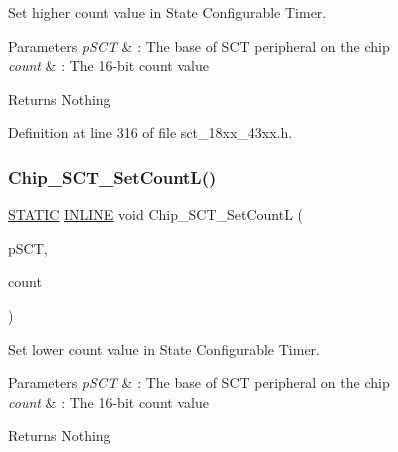 Set higher count value in State Configurable Timer. 


\begin{DoxyParams}{Parameters}
{\em p\+S\+CT} & \+: The base of S\+CT peripheral on the chip \\
\hline
{\em count} & \+: The 16-\/bit count value \\
\hline
\end{DoxyParams}
\begin{DoxyReturn}{Returns}
Nothing 
\end{DoxyReturn}


Definition at line 316 of file sct\+\_\+18xx\+\_\+43xx.\+h.

\mbox{\label{group___s_c_t__18_x_x__43_x_x_gac9d69eb39a8131925508015bf36c22f7}} 
\subsubsection{\texorpdfstring{Chip\+\_\+\+S\+C\+T\+\_\+\+Set\+Count\+L()}{Chip\_SCT\_SetCountL()}}
{\footnotesize\ttfamily \hyperlink{group___l_p_c___types___public___macros_ga10b2d890d871e1489bb02b7e70d9bdfb}{S\+T\+A\+T\+IC} \hyperlink{spifi__18xx__43xx_8h_a2eb6f9e0395b47b8d5e3eeae4fe0c116}{I\+N\+L\+I\+NE} void Chip\+\_\+\+S\+C\+T\+\_\+\+Set\+CountL (\begin{DoxyParamCaption}\item[{\hyperlink{struct_l_p_c___s_c_t___t}{L\+P\+C\+\_\+\+S\+C\+T\+\_\+T} $\ast$}]{p\+S\+CT,  }\item[{uint16\+\_\+t}]{count }\end{DoxyParamCaption})}



Set lower count value in State Configurable Timer. 


\begin{DoxyParams}{Parameters}
{\em p\+S\+CT} & \+: The base of S\+CT peripheral on the chip \\
\hline
{\em count} & \+: The 16-\/bit count value \\
\hline
\end{DoxyParams}
\begin{DoxyReturn}{Returns}
Nothing 
\end{DoxyReturn}


